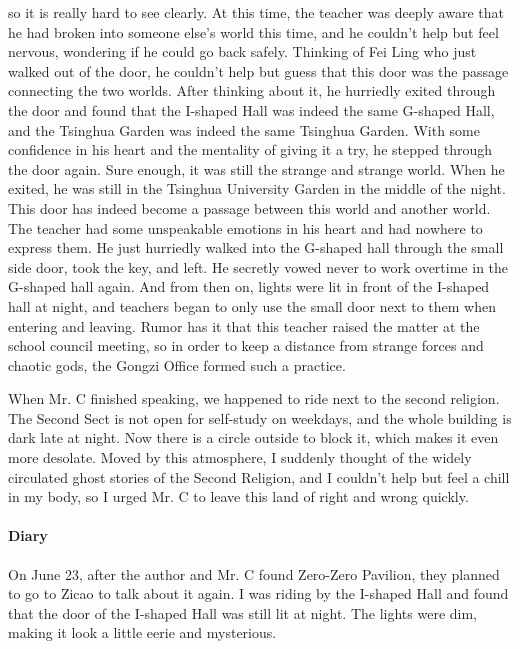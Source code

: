 so it is really hard to see clearly.  At this time, the teacher was deeply
aware that he had broken into someone else's world this time, and he couldn't
help but feel nervous, wondering if he could go back safely. Thinking of Fei
Ling who just walked out of the door, he couldn't help but guess that this door
was the passage connecting the two worlds.  After thinking about it, he
hurriedly exited through the door and found that the I-shaped Hall was indeed
the same G-shaped Hall, and the Tsinghua Garden was indeed the same Tsinghua
Garden.  With some confidence in his heart and the mentality of giving it a
try, he stepped through the door again. Sure enough, it was still the strange
and strange world. When he exited, he was still in the Tsinghua University
Garden in the middle of the night.  This door has indeed become a passage
between this world and another world.  The teacher had some unspeakable
emotions in his heart and had nowhere to express them. He just hurriedly walked
into the G-shaped hall through the small side door, took the key, and left. He
secretly vowed never to work overtime in the G-shaped hall again.  And from
then on, lights were lit in front of the I-shaped hall at night, and teachers
began to only use the small door next to them when entering and leaving.  Rumor
has it that this teacher raised the matter at the school council meeting, so in
order to keep a distance from strange forces and chaotic gods, the Gongzi
Office formed such a practice.

When Mr. C finished speaking, we happened to ride next to the second religion.
The Second Sect is not open for self-study on weekdays, and the whole building
is dark late at night. Now there is a circle outside to block it, which makes
it even more desolate.  Moved by this atmosphere, I suddenly thought of the
widely circulated ghost stories of the Second Religion, and I couldn't help but
feel a chill in my body, so I urged Mr. C to leave this land of right and wrong
quickly.

\vfill

\paragraph{Diary} On June 23, after the author and Mr. C found Zero-Zero
Pavilion, they planned to go to Zicao to talk about it again. I was riding by
the I-shaped Hall and found that the door of the I-shaped Hall was still lit at
night. The lights were dim, making it look a little eerie and mysterious.

